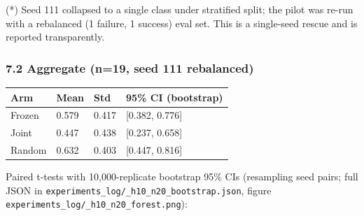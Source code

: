 \documentclass[
]{article}
\newcounter{none} %
\begin{document}
(*) Seed 111 collapsed to a single class under stratified split; the
pilot was re-run with a rebalanced (1 failure, 1 success) eval set. This
is a single-seed rescue and is reported transparently.

\subsubsection{7.2 Aggregate (n=19, seed 111
rebalanced)}\label{aggregate-n19-seed-111-rebalanced}

{\def\LTcaptype{none} %
\begin{longtable}[]{@{}llll@{}}
\toprule\noalign{}
Arm & Mean & Std & 95\% CI (bootstrap) \\
\midrule\noalign{}
\endhead
\bottomrule\noalign{}
\endlastfoot
Frozen & 0.579 & 0.417 & {[}0.382, 0.776{]} \\
Joint & 0.447 & 0.438 & {[}0.237, 0.658{]} \\
Random & 0.632 & 0.403 & {[}0.447, 0.816{]} \\
\end{longtable}
}

Paired t-tests with 10,000-replicate bootstrap 95\% CIs (resampling seed
pairs; full JSON in
\texttt{experiments\_log/\_h10\_n20\_bootstrap.json}, figure
\texttt{experiments\_log/\_h10\_n20\_forest.png}):
\end{document}
